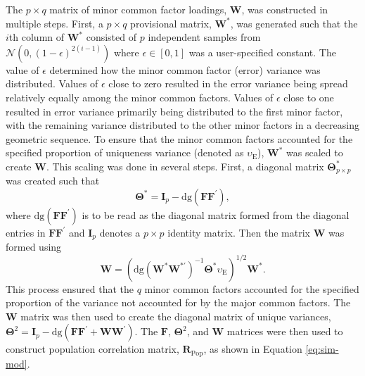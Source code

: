 \documentclass[
  english,
  man]{apa6}
\begin{document}
The \(p \times q\) matrix of minor common factor loadings, \(\mathbf{W}\), was constructed in multiple steps. First, a \(p \times q\) provisional matrix, \(\mathbf{W}^*\), was generated such that the \(i\)th column of \(\mathbf{W}^*\) consisted of \(p\) independent samples from \(\mathcal{N}(0, (1 - \epsilon)^{2(i-1)})\) where \(\epsilon \in [0,1]\) was a user-specified constant. The value of \(\epsilon\) determined how the minor common factor (error) variance was distributed. Values of \(\epsilon\) close to zero resulted in the error variance being spread relatively equally among the minor common factors. Values of \(\epsilon\) close to one resulted in error variance primarily being distributed to the first minor factor, with the remaining variance distributed to the other minor factors in a decreasing geometric sequence. To ensure that the minor common factors accounted for the specified proportion of uniqueness variance (denoted as \(\upsilon_{\textrm{E}}\)), \(\mathbf{W}^*\) was scaled to create \(\mathbf{W}\). This scaling was done in several steps. First, a diagonal matrix \(\mathbf{\Theta}^*_{p \times p}\) was created such that
\begin{equation}
\mathbf{\Theta}^* = \mathbf{I}_p - \textrm{dg}(\mathbf{F}\mathbf{F}^\prime),
\label{eq:theta-star}
\end{equation}
where \(\textrm{dg}(\mathbf{F}\mathbf{F}^\prime)\) is to be read as the diagonal matrix formed from the diagonal entries in \(\mathbf{F}\mathbf{F}^\prime\) and \(\mathbf{I}_p\) denotes a \(p \times p\) identity matrix. Then the matrix \(\mathbf{W}\) was formed using
\begin{equation}
\mathbf{W} = (\textrm{dg}(\mathbf{W}^* \mathbf{W}^{*\prime})^{-1} \mathbf{\Theta}^* \upsilon_\textrm{E})^{1/2} \mathbf{W}^*.
\label{eq:W-matrix}
\end{equation}
This process ensured that the \(q\) minor common factors accounted for the specified proportion of the variance not accounted for by the major common factors. The \(\mathbf{W}\) matrix was then used to create the diagonal matrix of unique variances, \(\mathbf{\Theta}^2 = \mathbf{I}_p - \textrm{dg}(\mathbf{FF}^\prime + \mathbf{WW}^\prime)\). The \(\mathbf{F}\), \(\mathbf{\Theta}^2\), and \(\mathbf{W}\) matrices were then used to construct population correlation matrix, \(\mathbf{R}_{\textrm{Pop}}\), as shown in Equation \eqref{eq:sim-mod}.
\end{document}
